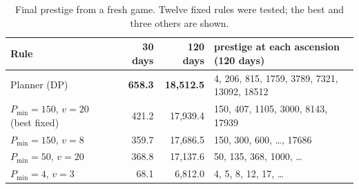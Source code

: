 \documentclass[11pt,a4paper]{article}
\numberwithin{equation}{section}
\theoremstyle{definition}
\theoremstyle{remark}
\begin{document}
\begin{table}[t]
\centering
\small
\begin{tabular}{@{}lrrl@{}}
\toprule
Rule & 30 days & 120 days & prestige at each ascension (120 days) \\
\midrule
Planner (DP) & \textbf{658.3} & \textbf{18{,}512.5} & 4, 206, 815, 1759, 3789, 7321, 13092, 18512 \\
$P_{\min}=150$, $v=20$ (best fixed) & 421.2 & 17{,}939.4 & 150, 407, 1105, 3000, 8143, 17939 \\
$P_{\min}=150$, $v=8$ & 359.7 & 17{,}686.5 & 150, 300, 600, \ldots, 17686 \\
$P_{\min}=50$, $v=20$ & 368.8 & 17{,}137.6 & 50, 135, 368, 1000, \ldots \\
$P_{\min}=4$, $v=3$ & 68.1 & 6{,}812.0 & 4, 5, 8, 12, 17, \ldots \\
\bottomrule
\end{tabular}
\caption{Final prestige from a fresh game. Twelve fixed rules were tested; the best and three others are shown.}
\label{tab:fresh}
\end{table}

\end{document}

